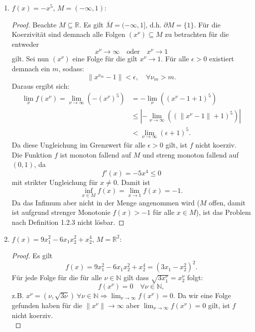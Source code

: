 \documentclass[12pt]{extreport} %
\newcommand{\N}{\mathbb{N}}
\newcommand{\R}{\mathbb{R}}
\theoremstyle{named}
\theoremstyle{nnamed}
\theoremstyle{itshape}
\theoremstyle{normal}
\begin{document}
	\begin{enumerate}
		\item $f(x) = - x^5$, $M =(- \infty, 1)$: ~\medskip
			\begin{proof}
			Beachte $M \subseteq \R$. Es gilt $\overline{M} = (-\infty, 1]$, d.h. $\partial M = \{ 1 \}$. Für die Koerzivität sind demnach alle Folgen $\left( x^\nu \right) \subseteq M$ zu betrachten für die entweder
			$$ x^\nu \longrightarrow \infty \quad \text{oder} \quad x^\nu \longrightarrow 1 $$
			gilt. Sei nun $(x^\nu)$ eine Folge für die gilt $x^\nu \rightarrow 1$. Für alle $\epsilon > 0$ existiert demnach ein $m$, sodass:
			$$ \| x^{\nu_m} - 1 \| < \epsilon, \quad \forall \nu_m > m. $$
			Daraus ergibt sich:
			\begin{align*}
				 \lim_\nu f(x^\nu) = \lim_{\nu \rightarrow \infty} \left( - \left(x^\nu \right)^5 \right) & = -  \lim_\nu \left( \left(x^\nu - 1 + 1 \right)^5 \right) \\
				 	& \leq \left| - \lim_{\nu \rightarrow \infty}  \left( \left( \| x^\nu -1 \| + 1 \right)^5 \right) \right| \\
				 	& < \lim_{\nu \rightarrow \infty}  \left( \epsilon + 1 \right)^5.  
			\end{align*}
			Da diese Ungleichung im Grenzwert für alle $\epsilon > 0$ gilt, ist $f$ nicht koerziv. ~\\ 
			
			Die Funktion $f$ ist monoton fallend auf $M$ und streng monoton fallend auf $(0, 1)$, da
			$$ f'(x) = - 5 x^4 \leq 0 $$
			mit strikter Ungleichung für $x \neq 0$. Damit ist 
			$$ \inf_{x \in M} f(x) = \lim_{x \rightarrow 1} f(x) = -1. $$
			Da das Infimum aber nicht in der Menge angenommen wird ($M$ offen, damit ist aufgrund strenger Monotonie $f(x) > -1$ für alle $x \in M$), ist das Problem nach Definition 1.2.3 nicht lösbar. 
			\end{proof}
		\item  $f(x) = 9 x_1^2 - 6 x_1 x_2^2 + x_2^4$, $M = \R^2$:
			\begin{proof}
			Es gilt
			$$ f(x) = 9 x_1^2 - 6 x_1 x_2^2 + x_2^4 = (3 x_1 - x_2^2)^2. $$
			Für jede Folge für die für alle $\nu \in \N$ gilt dass $\sqrt{3 x^\nu_1} = x^\nu_2$ folgt:
			$$ f(x^\nu) = 0 \quad \forall \nu \in \N, $$
			z.B. $x^\nu = (\nu, \sqrt{3\nu}) ~\forall \nu \in \N \Rightarrow \lim_{\nu \rightarrow \infty} f(x^\nu) = 0$. Da wir eine Folge gefunden haben für die $\| x^\nu \| \rightarrow \infty$ aber $\lim_{\nu \rightarrow \infty} f(x^\nu) = 0$ gilt, ist $f$ nicht koerziv. ~\\ 
			

\end{proof}
\end{enumerate}
\end{document}
